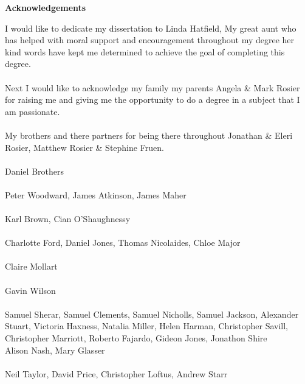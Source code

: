 \thispagestyle{empty}

\begin{center}
    {\LARGE\bf Acknowledgements}
\end{center}
I would like to dedicate my dissertation to Linda Hatfield, My great aunt who has helped with moral support and encouragement throughout my degree her kind words have kept me determined to achieve the goal of completing this degree.\\
\\
Next I would like to acknowledge my family my parents Angela \& Mark Rosier for raising me and giving me the opportunity to do a degree in a subject that I am passionate.\\
\\
My brothers and there partners for being there throughout Jonathan \& Eleri Rosier, Matthew Rosier \& Stephine Fruen.\\
\\
Daniel Brothers\\
\\
Peter Woodward, James Atkinson, James Maher\\
\\
Karl Brown, Cian O'Shaughnessy\\
\\
Charlotte Ford, Daniel Jones, Thomas Nicolaides, Chloe Major\\
\\
Claire Mollart\\
\\
Gavin Wilson\\
\\
Samuel Sherar, Samuel Clements, Samuel Nicholls, Samuel Jackson, Alexander Stuart, Victoria Haxness, Natalia Miller, Helen Harman, Christopher Savill, Christopher Marriott, Roberto Fajardo, Gideon Jones, Jonathon Shire
\\
Alison Nash, Mary Glasser\\
\\
Neil Taylor, David Price, Christopher Loftus, Andrew Starr\\